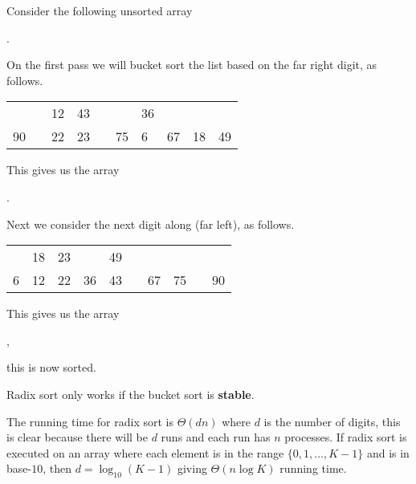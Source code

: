 \begin{example}
    Consider the following unsorted array 
    \begin{center}
        \ttfamily
        [67, 23, 90, 6, 43, 22, 18, 75, 49, 12, 36].
    \end{center}
    On the first pass we will bucket sort the list based on the far right digit, as follows.
    \begin{center}
        \ttfamily
        \begin{tabular}{|R{1em}|R{1em}|R{1em}|R{1em}|R{1em}|R{1em}|R{1em}|R{1em}|R{1em}|R{1em}|}
            & & 12 & 43 & & & 36 & & & \\
            90 &  & 22 & 23 & & 75 & 6 & 67 & 18 & 49 \\
        \end{tabular}
    \end{center}
    This gives us the array
    \begin{center}
        \ttfamily
        [90, 22, 12, 23, 43, 75, 6, 36, 67, 18, 49].
    \end{center}
    Next we consider the next digit along (far left), as follows.
    \begin{center}
        \ttfamily
        \begin{tabular}{|R{1em}|R{1em}|R{1em}|R{1em}|R{1em}|R{1em}|R{1em}|R{1em}|R{1em}|R{1em}|}
            & 18 & 23 & & 49 & & & & & \\
            \hspace{0em} 6 & 12 & 22 & 36 & 43 & & 67 & 75 &  & 90
        \end{tabular}
    \end{center}
    This gives us the array
    \begin{center}
        \ttfamily
        [6, 12, 18, 22, 23, 36, 43, 49, 67, 75, 90],
    \end{center}
    this is now sorted.
\end{example}

\begin{remark}
    Radix sort only works if the bucket sort is \textbf{stable}.
\end{remark}

The running time for radix sort is $\Theta(dn)$ where $d$ is the number of digits, this is clear because there will be $d$ runs and each run has $n$ processes. If radix sort is executed on an array where each element is in the range $\{ 0, 1, \ldots, K - 1 \}$ and is in base-$10$, then $d = \log_{10}{(K - 1)}$ giving $\Theta(n \log{K})$ running time.

